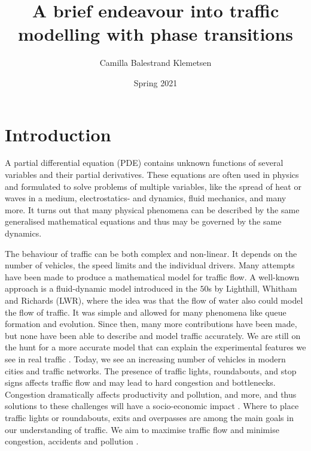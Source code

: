 \documentclass[10pt]{article}
\title{A brief endeavour into traffic modelling with phase transitions}
\author{Camilla Balestrand Klemetsen}
\date{Spring 2021}
\numberwithin{equation}{section}
\begin{document}
\maketitle
\newpage
{}


\tableofcontents 

\newpage
{}

\section{Introduction}
A partial differential equation (PDE) contains unknown functions of several variables and their partial derivatives. These equations are often used in physics and formulated to solve problems of multiple variables, like the spread of heat or waves in a medium, electrostatics- and dynamics, fluid mechanics, and many more. It turns out that many physical phenomena can be described by the same generalised mathematical equations and thus may be governed by the same dynamics.

The behaviour of traffic can be both complex and non-linear. It depends on the number of vehicles, the speed limits and the individual drivers. Many attempts have been made to produce a mathematical model for traffic flow. A well-known approach is a fluid-dynamic model introduced in the $50$s by Lighthill, Whitham and Richards (LWR), where the idea was that the flow of water also could model the flow of traffic. It was simple and allowed for many phenomena like queue formation and evolution. Since then, many more contributions have been made, but none have been able to describe and model traffic accurately. We are still on the hunt for a more accurate model that can explain the experimental features we see in real traffic \cite{KernerHelbing}. Today, we see an increasing number of vehicles in modern cities and traffic networks. The presence of traffic lights, roundabouts, and stop signs affects traffic flow and may lead to hard congestion and bottlenecks. Congestion dramatically affects productivity and pollution, and more, and thus solutions to these challenges will have a socio-economic impact \cite{GaravelloMauro2006Tfon}. Where to place traffic lights or roundabouts, exits and overpasses are among the main goals in our understanding of traffic. We aim to maximise traffic flow and minimise congestion, accidents and pollution \cite{GaravelloMauro2006Tfon}.
\end{document}
